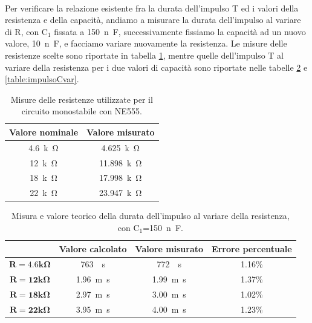 \documentclass{report}
\begin{document}
\\Per verificare la relazione esistente fra la durata dell'impulso T ed i valori della resistenza e della capacità, andiamo a misurare la durata dell'impulso al variare di R, con $\mathrm{C_1}$ fissata a \SI{150}{n\farad}, successivamente fissiamo la capacità ad un nuovo valore, \SI{10}{n\farad}, e facciamo variare nuovamente la resistenza. Le misure delle resistenze scelte sono riportate in tabella \ref{table:mis_res2}, mentre quelle dell'impulso T al variare della resistenza per i due valori di capacità sono riportate nelle tabelle \ref{table:impulsoRvar} e \ref{table:impulsoCvar}.
\begin{table}[h!]
	\centering
	\begin{tabular}{|c|c|}
	\hline
		\textbf{Valore nominale} & \textbf{Valore misurato}\\ 
		\hline
		\SI{4.6}{k\ohm} & \SI{4.625}{k\ohm} \\ 
		\hline
		 \SI{12}{k\ohm} & \SI{11.898}{k\ohm} \\ 
		\hline
		\SI{18}{k\ohm} & \SI{17.998}{k\ohm} \\ 
		\hline
		 \SI{22}{k\ohm} & \SI{23.947}{k\ohm} \\ 
		\hline
	\end{tabular}
	\caption{Misure delle resistenze utilizzate per il circuito monostabile con NE555.}
	\label{table:mis_res2}
\end{table}
\begin{table}[h!]
	\centering
	\begin{tabular}{|c|c|c|c|}
		\cline{2-4} 
		\multicolumn{1}{c|}{} & \textbf{Valore calcolato} & \textbf{Valore misurato}& \textbf{Errore percentuale}\\ 
		\hline
		$\mathbf{{R = 4.6k}\Omega}$ & \SI{763}{\mu\second} & \SI{772}{\mu\second} & 1.16\% \\ 
		\hline
		$\mathbf{{R = 12k}\Omega}$ & \SI{1.96}{m\second} & \SI{1.99}{m\second} & 1.37\% \\ 
		\hline
		$\mathbf{{R = 18k}\Omega}$ & \SI{2.97}{m\second} & \SI{3.00}{m\second} & 1.02\% \\ 
		\hline
		$\mathbf{{R = 22k}\Omega}$ & \SI{3.95}{m\second} & \SI{4.00}{m\second} & 1.23\% \\ 
		\hline
	\end{tabular}
	\caption{Misura e valore teorico della durata dell'impulso al variare della resistenza, con $\mathrm{C_1}$=\SI{150}{n\farad}.}
	\label{table:impulsoRvar}
\end{table}
\end{document}
